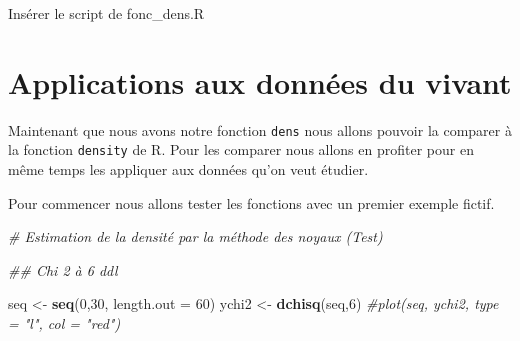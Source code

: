 \documentclass[
]{book}
\newenvironment{Shaded}{\begin{snugshade}}{\end{snugshade}}
\newcommand{\CommentTok}[1]{\textcolor[rgb]{0.56,0.35,0.01}{\textit{#1}}}
\newcommand{\DataTypeTok}[1]{\textcolor[rgb]{0.13,0.29,0.53}{#1}}
\newcommand{\DecValTok}[1]{\textcolor[rgb]{0.00,0.00,0.81}{#1}}
\newcommand{\KeywordTok}[1]{\textcolor[rgb]{0.13,0.29,0.53}{\textbf{#1}}}
\newcommand{\NormalTok}[1]{#1}
\newcommand{\StringTok}[1]{\textcolor[rgb]{0.31,0.60,0.02}{#1}}
\begin{document}
Insérer le script de fonc\_dens.R

\hypertarget{applications-aux-donnuxe9es-du-vivant}{%
\section{Applications aux données du vivant}\label{applications-aux-donnuxe9es-du-vivant}}

Maintenant que nous avons notre fonction \texttt{dens} nous allons pouvoir la comparer à la fonction \texttt{density} de R. Pour les comparer nous allons en profiter pour en même temps les appliquer aux données qu'on veut étudier.

Pour commencer nous allons tester les fonctions avec un premier exemple fictif.

\begin{Shaded}
\begin{Highlighting}[]
\CommentTok{# Estimation de la densité par la méthode des noyaux (Test)}

\CommentTok{## Chi 2 à 6 ddl}

\NormalTok{seq <-}\StringTok{ }\KeywordTok{seq}\NormalTok{(}\DecValTok{0}\NormalTok{,}\DecValTok{30}\NormalTok{, }\DataTypeTok{length.out =} \DecValTok{60}\NormalTok{)}
\NormalTok{ychi2 <-}\StringTok{ }\KeywordTok{dchisq}\NormalTok{(seq,}\DecValTok{6}\NormalTok{)}
\CommentTok{#plot(seq, ychi2, type = "l", col = "red")}


\end{Highlighting}
\end{Shaded}
\end{document}
